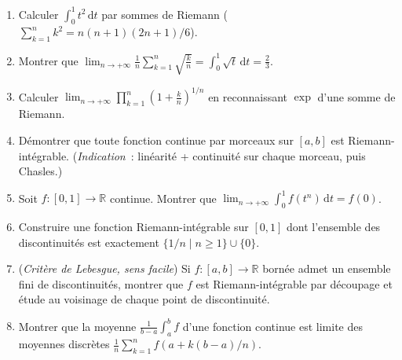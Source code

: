 \begin{mdframed}[style=exobar]
  \begin{enumerate}
    \item Calculer $\displaystyle\int_0^1 t^2\,\mathrm{d}t$ par sommes
          de Riemann ($\sum_{k=1}^n k^2 = n(n+1)(2n+1)/6$).

    \item Montrer que $\displaystyle\lim_{n\to+\infty}\frac{1}{n}\sum_{k=1}^{n}\sqrt{\frac{k}{n}} = \int_0^1\sqrt{t}\,\mathrm{d}t = \frac{2}{3}$.

    \item Calculer
          $\displaystyle\lim_{n\to+\infty}\prod_{k=1}^{n}\!\left(1+\frac{k}{n}\right)^{1/n}$
          en reconnaissant $\exp$ d'une somme de Riemann.

    \item Démontrer que toute fonction continue par morceaux sur $[a,b]$
          est Riemann-intégrable. (\textit{Indication}~: linéarité +
          continuité sur chaque morceau, puis Chasles.)

    \item Soit $f:[0,1]\to\mathbb{R}$ continue. Montrer que
          $\displaystyle\lim_{n\to+\infty}\int_0^1 f(t^n)\,\mathrm{d}t = f(0)$.

    \item Construire une fonction Riemann-intégrable sur $[0,1]$ dont
          l'ensemble des discontinuités est exactement $\{1/n \mid n\geq 1\}\cup\{0\}$.

    \item (\textit{Critère de Lebesgue, sens facile}) Si $f:[a,b]\to\mathbb{R}$
          bornée admet un ensemble fini de discontinuités, montrer que $f$
          est Riemann-intégrable par découpage et étude au voisinage de chaque
          point de discontinuité.

    \item Montrer que la moyenne $\frac{1}{b-a}\int_a^b f$ d'une fonction
          continue est limite des moyennes discrètes
          $\frac{1}{n}\sum_{k=1}^n f(a + k(b-a)/n)$.
  \end{enumerate}
\end{mdframed}

